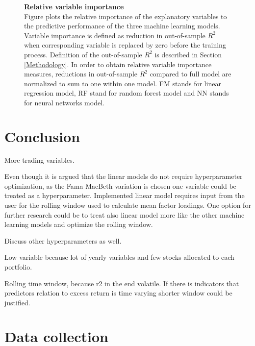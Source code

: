 \documentclass{article}
\begin{document}
\begin{figure}[ht]
\centering
\caption[Relative variable importance]{\textbf{Relative variable importance}\\ Figure plots the relative importance of the explanatory variables to the predictive performance of the three machine learning models. Variable importance is defined as reduction in out-of-sample $R^2$ when corresponding variable is replaced by zero before the training process. Definition of the out-of-sample $R^2$ is described in Section \ref{Methodology}. In order to obtain relative variable importance measures, reductions in out-of-sample $R^2$ compared to full model are normalized to sum to one within one model. FM stands for linear regression model, RF stand for random forest model and NN stands for neural networks model.}

\label{plot:relative_VI}
\end{figure}

\section{Conclusion}\label{Conclusion}

More trading variables.

Even though it is argued that the linear models do not require hyperparameter optimization, as the Fama MacBeth variation is chosen one variable could be treated as a hyperparameter. Implemented linear model requires input from the user for the rolling window used to calculate mean factor loadings. One option for further research could be to treat also linear model more like the other machine learning models and optimize the rolling window.

Discuss other hyperparameters as well.

Low variable because lot of yearly variables and few stocks allocated to each portfolio.

Rolling time window, because r2 in the end volatile. If there is indicators that predictors relation to excess return is time varying shorter window could be justified.

\clearpage

\appendix
\section{Data collection}
\renewcommand{\thefigure}{A.\arabic{figure}}
\setcounter{figure}{0}
\renewcommand{\thetable}{A.\arabic{table}}
\setcounter{table}{0}
\end{document}
